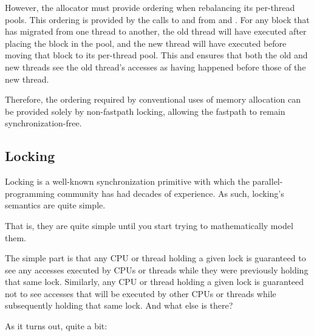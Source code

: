 However, the allocator must provide ordering when rebalancing its
per-thread pools.
This ordering is provided by the calls to  and
 from  and .
For any block that has migrated from one thread to another, the old
thread will have executed  after
placing the block in the  pool, and the new thread will
have executed  before moving that
block to its per-thread pool.
This  and  ensures that both the
old and new threads see the old thread's accesses as having happened
before those of the new thread.

\QuickQuizEnd

Therefore, the ordering required by conventional uses of memory allocation
can be provided solely by non-fastpath locking, allowing the fastpath to
remain synchronization-free.

\subsection{Locking}
\label{sec:memorder:Locking}

Locking is a well-known synchronization primitive with which the
parallel-programming community has had decades of experience.
As such, locking's semantics are quite simple.

That is, they are quite simple until you start trying to mathematically
model them.

The simple part is that any CPU or thread holding a given lock is
guaranteed to see any accesses executed by CPUs or threads while they
were previously holding that same lock.
Similarly, any CPU or thread holding a given lock is guaranteed not
to see accesses that will be executed by other CPUs or threads while
subsequently holding that same lock.
And what else is there?

As it turns out, quite a bit:

